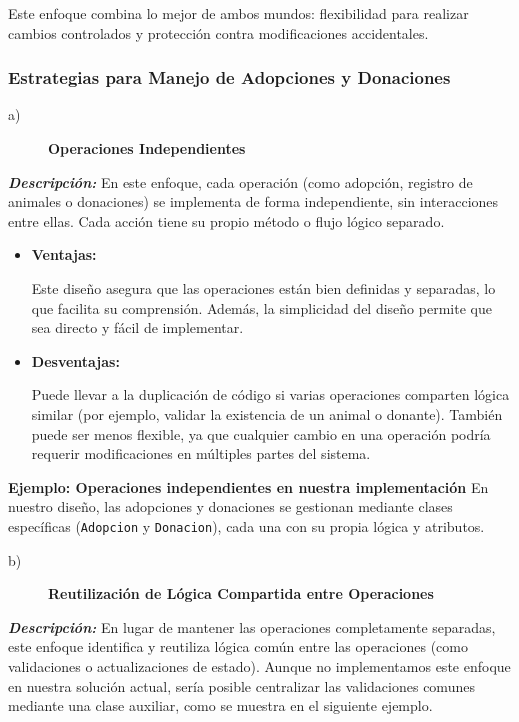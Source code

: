 Este enfoque combina lo mejor de ambos mundos: flexibilidad para realizar cambios controlados 
y protección contra modificaciones accidentales.



\subsubsection{Estrategias para Manejo de Adopciones y Donaciones}

\begin{description}
    \item[a)] \textbf{Operaciones Independientes}
\end{description}

\textit{\textbf{Descripción:}}  
En este enfoque, cada operación (como adopción, registro de animales o donaciones) se 
implementa de forma independiente, sin interacciones entre ellas. Cada acción tiene su 
propio método o flujo lógico separado.

\begin{itemize}
    \item \textbf{Ventajas:}\par
    Este diseño asegura que las operaciones están bien definidas y separadas, lo que 
    facilita su comprensión. Además, la simplicidad del diseño permite que sea directo y 
    fácil de implementar.
    \item \textbf{Desventajas:}\par
    Puede llevar a la duplicación de código si varias operaciones comparten lógica similar 
    (por ejemplo, validar la existencia de un animal o donante). También puede ser menos 
    flexible, ya que cualquier cambio en una operación podría requerir modificaciones en 
    múltiples partes del sistema.
\end{itemize}

\textbf{Ejemplo: Operaciones independientes en nuestra implementación}  
En nuestro diseño, las adopciones y donaciones se gestionan mediante clases específicas 
(\texttt{Adopcion} y \texttt{Donacion}), cada una con su propia lógica y atributos.

\begin{description}
    \item[b)] \textbf{Reutilización de Lógica Compartida entre Operaciones}
\end{description}

\textit{\textbf{Descripción:}}  
En lugar de mantener las operaciones completamente separadas, este enfoque identifica y 
reutiliza lógica común entre las operaciones (como validaciones o actualizaciones de estado). Aunque no implementamos este enfoque en nuestra solución actual, sería posible centralizar las validaciones comunes mediante una clase auxiliar, como se muestra en el siguiente ejemplo.

